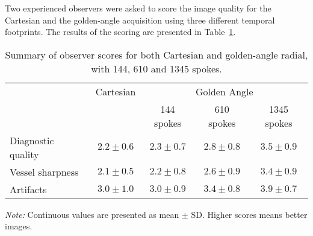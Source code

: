 Two experienced observers were asked to score the image quality for the Cartesian and the golden-angle acquisition using three different temporal footprints. The results of the scoring are presented in Table~\ref{table:study1scores}.
\begin{table}[htbp]
\caption{Summary of observer scores for both Cartesian and golden-angle radial, with 144, 610 and 1345 spokes.}
\begin{center}
\begin{threeparttable}
\begin{tabular}{l c c c c}
     \mydarkrowcolor~ & Cartesian & \multicolumn{3}{c}{Golden Angle} \\
     \mydarkrowcolor~ & ~ & 144 spokes & 610 spokes & 1345 spokes \\
     Diagnostic quality & $2.2 \pm 0.6$ & $2.3 \pm 0.7$ & $2.8 \pm 0.8$ & $3.5 \pm 0.9$ \\
     \myrowcolor Vessel sharpness & $2.1 \pm 0.5$ & $2.2 \pm 0.8$ & $2.6 \pm 0.9$ & $3.4 \pm 0.9$ \\
     Artifacts & $3.0 \pm 1.0$ & $3.0 \pm 0.9$ & $3.4 \pm 0.8$ & $3.9 \pm 0.7$ \\
     \bottomrule
\end{tabular}
\begin{tablenotes}
\emph{Note:} Continuous values are presented as mean $\pm$ SD. Higher scores means better images.
\end{tablenotes}
\end{threeparttable}
\end{center}
\label{table:study1scores}
\end{table}

